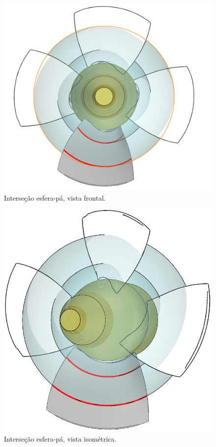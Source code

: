 \begin{figure}[!ht]
	\centering
	\includegraphics[width=.7\columnwidth]{figs/planejamento/intersecao_frontal.PNG}
	\caption{Interseção esfera-pá, vista frontal.}
	\label{fig::interfrontal}
\end{figure}

\begin{figure}[!ht]
	\centering
	\includegraphics[width=.6\columnwidth]{figs/planejamento/intersecao_iso.PNG}
	\caption{Interseção esfera-pá, vista isométrica.}
	\label{fig::interiso}
\end{figure}


